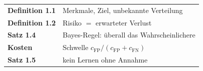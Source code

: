 \begin{merksatz}
\begin{center}
\renewcommand{\arraystretch}{1.5}
\begin{tabular}{@{}P{3.0cm}P{5.6cm}@{}}
\toprule
\textbf{Definition 1.1} & Merkmale, Ziel, unbekannte Verteilung\\
\textbf{Definition 1.2} & Risiko $=$ erwarteter Verlust\\
\textbf{Satz 1.4} & Bayes-Regel: überall das Wahrscheinlichere\\
\textbf{Kosten} & Schwelle $c_{\text{FP}}/(c_{\text{FP}}+c_{\text{FN}})$\\
\textbf{Satz 1.5} & kein Lernen ohne Annahme\\
\bottomrule
\end{tabular}
\end{center}

\begin{center}
\begin{minipage}{0.88\textwidth}
\end{minipage}
\end{center}
\end{merksatz}
